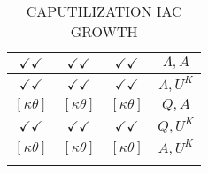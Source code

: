 \documentclass[a4paper,10pt]{article}
\begin{document}
\begin{longtable}{|c|c|c|c|}
\hline
$\checkmark\checkmark$ & $\checkmark\checkmark$ & $\checkmark\checkmark$ & ${\Lambda},{A}$ \\
\hline
$\checkmark\checkmark$ & $\checkmark\checkmark$ & $\checkmark\checkmark$ & ${\Lambda},{U^K}$ \\
\hline
$[\kappa \theta ]$ & $[\kappa \theta ]$ & $[\kappa \theta ]$ & ${Q},{A}$ \\
\hline
$\checkmark\checkmark$ & $\checkmark\checkmark$ & $\checkmark\checkmark$ & ${Q},{U^K}$ \\
\hline
$[\kappa \theta ]$ & $[\kappa \theta ]$ & $[\kappa \theta ]$ & ${A},{U^K}$ \\
\hline
\caption{CAPUTILIZATION IAC GROWTH}
\label{table:MyTableLabel}
\end{longtable}
\end{document}
